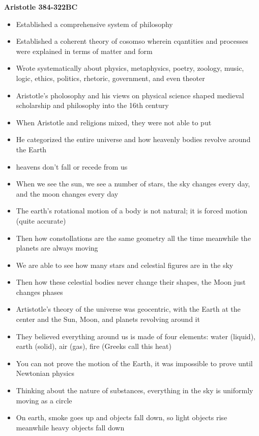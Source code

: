 \documentclass{article}
\begin{document}
  \textbf{Aristotle 384-322BC}
  \begin{itemize}
    \item Established a comprehensive system of philosophy
    \item Established a coherent theory of cosomso wherein cqantities and processes
      were explained in terms of matter and form
    \item Wrote systematically about physics, metaphysics,
      poetry, zoology, music, logic, ethics, politics, rhetoric, government,
      and even theoter
    \item Aristotle's pholosophy and his views on physical science
      shaped medieval scholarship and philosophy into the 16th century
    \item When Aristotle and religions mixed, they were not able to put
    \item He categorized the entire universe and how heavenly bodies
      revolve around the Earth
    \item heavens don't fall or recede from us
    \item When we see the sun, we see a number of stars, the sky changes
      every day, and the moon changes every day
    \item The earth's rotational motion of a body
      is not natural; it is forced motion (quite accurate)
    \item Then how constollations are the same geometry all the time meanwhile
      the planets are always moving
    \item We are able to see how many stars and celestial figures are in the sky
    \item Then how these celestial bodies never change their shapes,
      the Moon just changes phases
    \item Artistotle's theory of the universe was geocentric, with the Earth at the center
      and the Sun, Moon, and planets revolving around it
    \item They believed everything around us is made of four elements:
      water (liquid), earth (solid), air (gas), fire (Greeks call this heat)
    \item You can not prove the motion of the Earth, it was
      impossible to prove until Newtonian physics
    \item Thinking about the nature of substances, everything in the
      sky is uniformly moving as a circle
    \item On earth, smoke goes up and objects fall down,
      so light objects rise meanwhile heavy objects fall down

\end{itemize}
\end{document}
